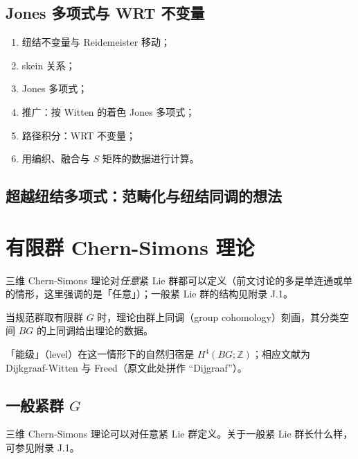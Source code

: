 \subsection{Jones 多项式与 WRT 不变量} %

\begin{enumerate}
  \item 纽结不变量与 Reidemeister 移动；
  \item skein 关系；
  \item Jones 多项式；
  \item 推广：按 Witten 的着色 Jones 多项式；
  \item 路径积分：WRT 不变量；
  \item 用编织、融合与 $S$ 矩阵的数据进行计算。
\end{enumerate}

\subsection{超越纽结多项式：范畴化与纽结同调的想法} %

\section{有限群 Chern-Simons 理论} %

\begin{keytakeaways}
  \item 三维 Chern-Simons 理论对\emph{任意}紧 Lie 群都可以定义（前文讨论的多是单连通或单的情形，这里强调的是「任意」）；一般紧 Lie 群的结构见附录 J.1。
  \item 当规范群取有限群 $G$ 时，理论由群上同调（group cohomology）刻画，其分类空间 $BG$ 的上同调给出理论的数据。
  \item 「能级」（level）在这一情形下的自然归宿是 $H^4(BG;\mathbb{Z})$；相应文献为 Dijkgraaf-Witten 与 Freed（原文此处拼作 ``Dijgraaf''）。
\end{keytakeaways}

\subsection{一般紧群 $G$} %

三维 Chern-Simons 理论可以对任意紧 Lie 群定义。关于一般紧 Lie 群长什么样，可参见附录 J.1。

